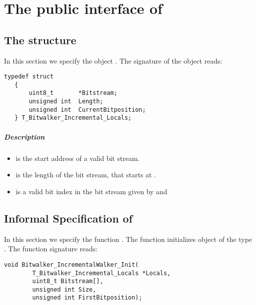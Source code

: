 

\chapter{The public interface of \bitwalker}

\section{The structure \bitwalkertype}


In this section we specify the object \locals.  The signature of the object reads:

\begin{lstlisting}[style=acsl-block]
   typedef struct
   {
       uint8_t       *Bitstream;
       unsigned int  Length;
       unsigned int  CurrentBitposition;
   } T_Bitwalker_Incremental_Locals;
\end{lstlisting}


\paragraph{Description}

\begin{itemize}

   \item {} is  the start address of a valid bit stream.
   \item {} is the length of the bit stream, that starts at .
   \item {} is a valid bit index in the bit stream given by  and 

\end{itemize}

\clearpage

\section{Informal Specification of }

In this section we specify the function \init.  The function  initializes object of the type \locals.
The function signature reads:


\begin{lstlisting}[style=acsl-block]
void Bitwalker_IncrementalWalker_Init(
        T_Bitwalker_Incremental_Locals *Locals,
        uint8_t Bitstream[],
        unsigned int Size,
        unsigned int FirstBitposition);
\end{lstlisting}


